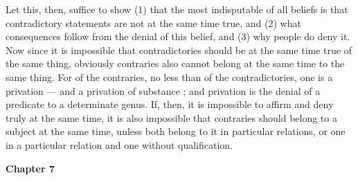 Let this, then, suffice to show (1) that the most indisputable of all beliefs is that contradictory statements are not at the same time true, and (2) what consequences follow from the denial of this belief, and (3) why people do deny it. Now since it is impossible that contradictories should be at the same time true of the same thing, obviously contraries also cannot belong at the same time to the same thing. For of the contraries, no less than of the contradictories, one is a privation — and a privation of substance ; and privation is the denial of a predicate to a determinate genus. If, then, it is impossible to affirm and deny truly at the same time, it is also impossible
that contraries should belong to a subject at the same time, unless both belong to it in particular relations, or one in a particular relation and one without qualification.

\textbf{Chapter 7}


